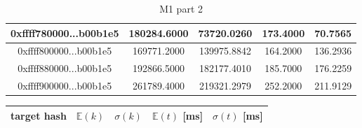 \documentclass[12pt, a4paper]{article}
\begin{document}
\begin{table}[H]
\begin{tabular}{|c|c|c|c|c|}
0xffff780000...b00b1e5 &   180284.6000 &    73720.0260 &       173.4000 &       70.7565 \\ \hline
0xffff800000...b00b1e5 &   169771.2000 &   139975.8842 &       164.2000 &      136.2936 \\ \hline
0xffff880000...b00b1e5 &   192866.5000 &   182177.4010 &       185.7000 &      176.2259 \\ \hline
0xffff900000...b00b1e5 &   261789.4000 &   219321.2979 &       252.2000 &      211.9129 \\ \hline
 \end{tabular}
    \caption{M1 part 2}
    \label{tab:m1_2}
\end{table}



\begin{table}[H]
    \centering
    \begin{tabular}{|c|c|c|c|c|} \hline
    target hash  & $\mathbb{E}(k)$ & $\sigma(k) $ & $\mathbb{E}(t)$ [ms] & $\sigma(t)$ [ms] \\ \hline
    

\end{tabular}
\end{table}
\end{document}
